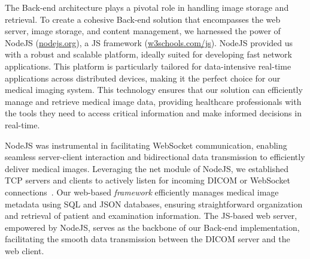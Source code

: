 \textcolor{revised}{The Back-end architecture plays a pivotal role in handling image storage and retrieval.
To create a cohesive Back-end solution that encompasses the web server, image storage, and content management, we harnessed the power of NodeJS (\href{https://nodejs.org/en}{nodejs.org}), a \ac{JS} framework (\href{https://www.w3schools.com/js/}{w3schools.com/js}).
NodeJS provided us with a robust and scalable platform, ideally suited for developing fast network applications.
This platform is particularly tailored for data-intensive real-time applications across distributed devices, making it the perfect choice for our medical imaging system.
This technology ensures that our solution can efficiently manage and retrieve medical image data, providing healthcare professionals with the tools they need to access critical information and make informed decisions in real-time.}

\textcolor{revised}{NodeJS was instrumental in facilitating WebSocket communication, enabling seamless server-client interaction and bidirectional data transmission to efficiently deliver medical images.
Leveraging the net module of NodeJS, we established \ac{TCP} servers and clients to actively listen for incoming \ac{DICOM} or WebSocket connections~\cite{WO2022071818A1}.
Our web-based {\it framework} efficiently manages medical image metadata using \ac{SQL} and \ac{JSON} databases, ensuring straightforward organization and retrieval of patient and examination information.
The \ac{JS}-based web server, empowered by NodeJS, serves as the backbone of our Back-end implementation, facilitating the smooth data transmission between the \ac{DICOM} server and the web client.}